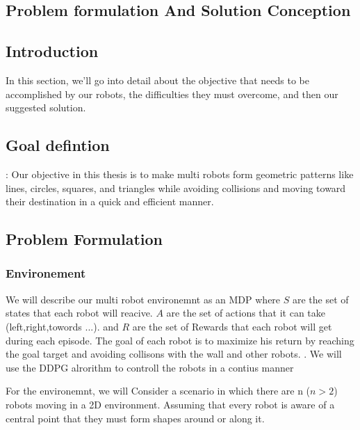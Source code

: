 \documentclass[12pt]{extarticle}
\begin{document}
  
  
\newpage
\pagebreak
\hspace{0pt}
\vfill
\begin{center}
\section{Problem formulation And Solution Conception }
\end{center}
\vfill
\hspace{0pt}

\pagebreak

 

\subsection{Introduction}
 In this section, we'll go into  detail about the objective that needs to be accomplished by our robots, the difficulties they must overcome, and then our suggested solution.
 
\subsection{Goal defintion}:
Our objective in this thesis is to make multi robots  form geometric patterns like lines, circles, squares, and triangles while avoiding collisions and moving toward their destination in a quick and efficient manner. 



\subsection{Problem Formulation}
 

\subsubsection{Environement}

We will describe our multi robot environemnt as an MDP where $S$ are the set of states that each robot will reacive. $A$ are the set of actions that it can take (left,right,towords ...). and $R$ are the set of Rewards that each robot will get during each episode.
The  goal of each robot is to  maximize his return by reaching the goal target and avoiding collisons with the wall and other  robots.
.
We will use the DDPG alrorithm to controll the robots in a contius manner




For the environemnt, we will Consider a scenario in which there are n ($n >  2$) robots moving in a 2D environment. Assuming that every robot is aware of a central point that they must form shapes around or along it.
\end{document}
